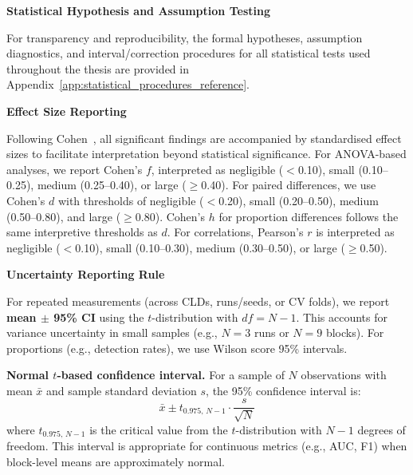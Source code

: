 \noindent\textbf{Statistical Hypothesis and Assumption Testing}
\label{sec:test_interpretation}

For transparency and reproducibility, the formal hypotheses, assumption diagnostics, and interval/correction procedures for all statistical tests used throughout the thesis are provided in Appendix~\ref{app:statistical_procedures_reference}.

\noindent\textbf{Effect Size Reporting}
\label{sec:effect_sizes}

Following Cohen~\cite{cohen1988statistical}, all significant findings are accompanied by standardised effect sizes to facilitate interpretation beyond statistical significance. For ANOVA-based analyses, we report Cohen's $f$, interpreted as negligible ($<$0.10), small (0.10--0.25), medium (0.25--0.40), or large ($\geq$0.40). For paired differences, we use Cohen's $d$ with thresholds of negligible ($<$0.20), small (0.20--0.50), medium (0.50--0.80), and large ($\geq$0.80). Cohen's $h$ for proportion differences follows the same interpretive thresholds as $d$. For correlations, Pearson's $r$ is interpreted as negligible ($<$0.10), small (0.10--0.30), medium (0.30--0.50), or large ($\geq$0.50).

\noindent\textbf{Uncertainty Reporting Rule}
\label{sec:uncertainty_rule}

For repeated measurements (across CLDs, runs/seeds, or CV folds), we report \textbf{mean $\pm$ 95\% CI} using the $t$-distribution with $df = N-1$. This accounts for variance uncertainty in small samples (e.g., $N=3$ runs or $N=9$ blocks). For proportions (e.g., detection rates), we use Wilson score 95\% intervals.

\noindent\textbf{Normal $t$-based confidence interval.} For a sample of $N$ observations with mean $\bar{x}$ and sample standard deviation $s$, the 95\% confidence interval is:
\begin{equation}
    \bar{x} \pm t_{0.975,\,N-1} \cdot \frac{s}{\sqrt{N}}
\end{equation}
where $t_{0.975,\,N-1}$ is the critical value from the $t$-distribution with $N-1$ degrees of freedom. This interval is appropriate for continuous metrics (e.g., AUC, F1) when block-level means are approximately normal.

